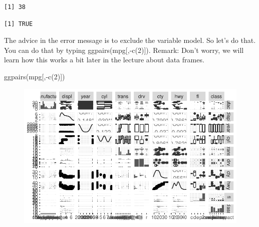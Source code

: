 \documentclass[
  letterpaper,
  DIV=11,
  numbers=noendperiod]{scrartcl}
\newenvironment{Shaded}{\begin{snugshade}}{\end{snugshade}}
\newcommand{\DecValTok}[1]{\textcolor[rgb]{0.68,0.00,0.00}{#1}}
\newcommand{\FunctionTok}[1]{\textcolor[rgb]{0.28,0.35,0.67}{#1}}
\newcommand{\NormalTok}[1]{\textcolor[rgb]{0.00,0.23,0.31}{#1}}
\newcommand{\SpecialCharTok}[1]{\textcolor[rgb]{0.37,0.37,0.37}{#1}}
\begin{document}
\begin{Shaded}
\end{Shaded}

\begin{verbatim}
[1] 38
\end{verbatim}

\begin{Shaded}
\end{Shaded}

\begin{verbatim}
[1] TRUE
\end{verbatim}

The advice in the error message is to exclude the variable model. So
let's do that. You can do that by typing ggpairs(mpg{[},-c(2){]}).
Remark: Don't worry, we will learn how this works a bit later in the
lecture about data frames.

\begin{Shaded}
\begin{Highlighting}[]
\FunctionTok{ggpairs}\NormalTok{(mpg[,}\SpecialCharTok{{-}}\FunctionTok{c}\NormalTok{(}\DecValTok{2}\NormalTok{)]) }
\end{Highlighting}
\end{Shaded}

\begin{figure}[H]

{\centering \includegraphics{Part1_Lecture1_Ex_files/figure-pdf/unnamed-chunk-39-1.pdf}

}

\end{figure}
\end{document}
